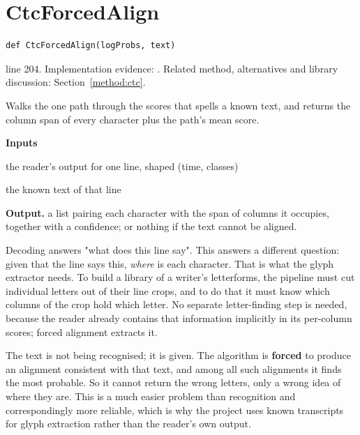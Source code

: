 \section{CtcForcedAlign}\label{fn:recognise:CtcForcedAlign}
\begin{lstlisting}[style=sig]
def CtcForcedAlign(logProbs, text)
\end{lstlisting}
 line 204. Implementation evidence: \cite{code2026}. Related method, alternatives and library discussion: Section~\ref{method:ctc}.


Walks the one path through the scores that spells a known text, and returns the column span of every character plus the path's mean score.




\noindent\textbf{Inputs}
\begin{description}[leftmargin=2.2em,style=nextline,font=\normalfont\ttfamily]\setlength\itemsep{1pt}
  \item[{logProbs}] \normalfont the reader's output for one line, shaped (time, classes)
  \item[{text}] \normalfont the known text of that line
\end{description}

\noindent\textbf{Output.} a list pairing each character with the span of columns it occupies, together with a confidence; or nothing if the text cannot be aligned.


Decoding answers "what does this line say". This answers a different question: given that the line says this, \emph{where} is each character. That is what the glyph extractor needs. To build a library of a writer's letterforms, the pipeline must cut individual letters out of their line crops, and to do that it must know which columns of the crop hold which letter. No separate letter-finding step is needed, because the reader already contains that information implicitly in its per-column scores; forced alignment extracts it.


The text is not being recognised; it is given. The algorithm is \textbf{forced} to produce an alignment consistent with that text, and among all such alignments it finds the most probable. So it cannot return the wrong letters, only a wrong idea of where they are. This is a much easier problem than recognition and correspondingly more reliable, which is why the project uses known transcripts for glyph extraction rather than the reader's own output.


